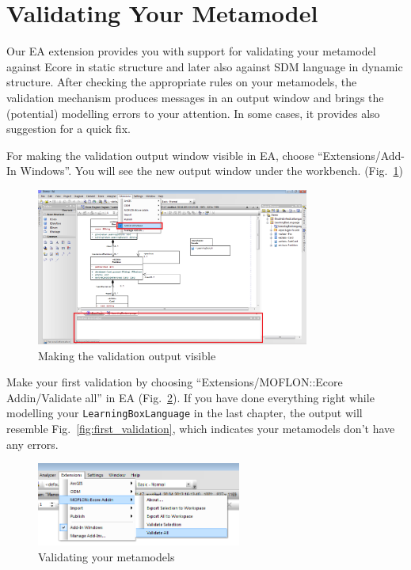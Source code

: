 \section{Validating Your Metamodel}
\label{sect:instance}

Our EA extension provides you with support for validating
your metamodel against Ecore in static structure and later also against SDM
language in dynamic structure. After checking the appropriate rules on your
metamodels, the validation mechanism produces messages in an output window and
brings the (potential) modelling errors to your attention. In some cases, it
provides also suggestion for a quick fix.

For making the validation output window visible in EA, choose ``Extensions/\-Add-In Windows''. You will see the new output window under the workbench. (Fig.~\ref{fig:validation_output})

\begin{figure}[htbp]
	\centering 
  \includegraphics[width=0.8\textwidth]{pics/memBoxBilder/memBox40} 
	\caption{Making the validation output visible}
	\label{fig:validation_output}
\end{figure}

Make your first validation by choosing ``Extensions/\-MOFLON::Ecore Addin/\-Validate all'' in EA (Fig.~\ref{fig:validation_menu}). 
If you have done everything right while modelling your \texttt{LearningBoxLanguage} in the last chapter, the output will resemble Fig.~\ref{fig:first_validation}, which indicates your metamodels don't have any errors.

\begin{figure}[htbp]
	\centering 
  \includegraphics[width=0.6\textwidth]{pics/memBoxBilder/memBox41} 
	\caption{Validating your metamodels}
	\label{fig:validation_menu}
\end{figure}

